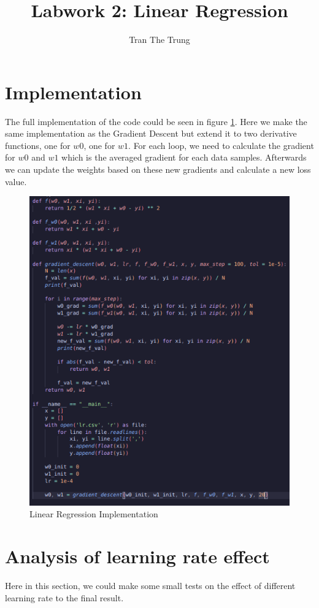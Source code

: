 \documentclass{article}
\title{Labwork 2: Linear Regression}
\author{Tran The Trung}
\begin{document}
\maketitle

\section{Implementation}
The full implementation of the code could be seen in figure \ref{fig:code}. Here we make the same implementation as the Gradient Descent but extend it to two derivative functions, one for $w0$, one for $w1$. For each loop, we need to calculate the gradient for $w0$ and $w1$ which is the averaged gradient for each data samples. Afterwards we can update the weights based on these new gradients and calculate a new loss value.

\begin{figure}[H]
    \centering
    \includegraphics[width=0.72\linewidth]{image/code.png}
    \caption{Linear Regression Implementation}
    \label{fig:code}
\end{figure}

\section{Analysis of learning rate effect}
Here in this section, we could make some small tests on the effect of different learning rate to the final result. 
\end{document}
